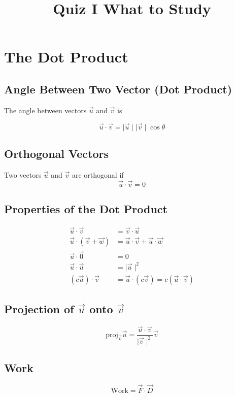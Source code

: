 \documentclass{article}
\title{Quiz I What to Study}
\begin{document}
\maketitle

\section{The Dot Product}

\subsection{Angle Between Two Vector (Dot Product)}
The angle between vectors $\vec{u}$ and $\vec{v}$ is

$$
\vec{u} \cdot \vec{v} = \mid \vec{u} \mid \mid \vec{v} \mid \cos \theta
$$

\subsection{Orthogonal Vectors}
Two vectors $\vec{u}$ and $\vec{v}$ are orthogonal if
$$
\vec{u} \cdot \vec{v} = 0
$$

\subsection{Properties of the Dot Product}
\begin{align*}
    \vec{u} \cdot \vec{v} &= \vec{v} \cdot \vec{u} \\
    \vec{u} \cdot (\vec{v} + \vec{w}) &= \vec{u} \cdot \vec{v} + \vec{u} \cdot \vec{w} \\
    \vec{u} \cdot \vec{0} &= 0 \\
    \vec{u} \cdot \vec{u} &= \mid \vec{u} \mid ^2 \\
    (c \vec{u}) \cdot \vec{v} &= \vec{u} \cdot (c \vec{v}) = c(\vec{u} \cdot \vec{v})
\end{align*}

\subsection{Projection of $\vec{u}$ onto $\vec{v}$}
$$
\text{proj}_{\vec{v}} \vec{u} = \frac{\vec{u} \cdot \vec{v}}{\mid \vec{v} \mid ^2} \vec{v}
$$

\subsection{Work}
$$
\text{Work} = \vec{F} \cdot \vec{D}
$$
\end{document}

